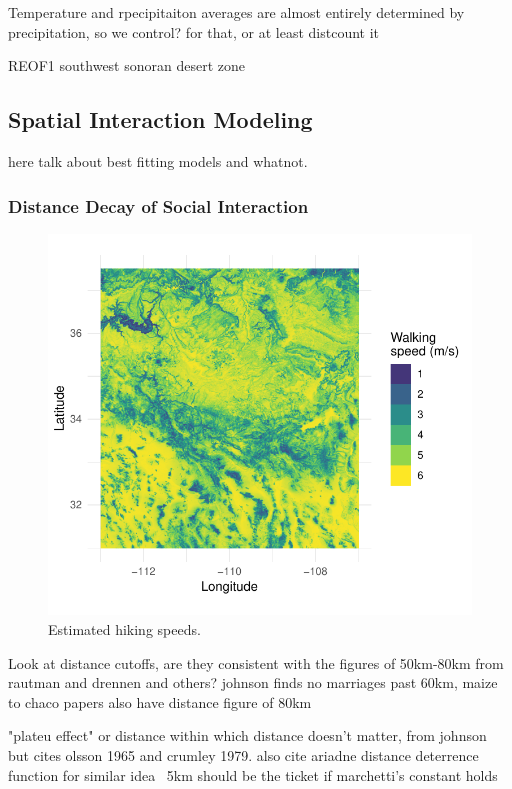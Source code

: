 \documentclass[fleqn,10pt]{wlscirep}
\begin{document}
Temperature and rpecipitaiton averages are almost entirely determined by precipitation, so we control? for that, or at least distcount it

REOF1 southwest sonoran desert zone

\subsection*{Spatial Interaction Modeling}

here talk about best fitting models and whatnot.

\subsubsection*{Distance Decay of Social Interaction}

\begin{figure}[ht]
\centering
\includegraphics[width=\linewidth]{figures/walking_speed.pdf}
\caption{Estimated hiking speeds.}
\label{fig:walking-speed}
\end{figure}

Look at distance cutoffs, are they consistent with the figures of 50km-80km from rautman and drennen and others? johnson finds no marriages past 60km, maize to chaco papers also have distance figure of 80km

"plateu effect" or distance within which distance doesn't matter, from johnson but cites olsson 1965 and crumley 1979. also cite ariadne distance deterrence function for similar idea
~5km should be the ticket if marchetti's constant holds
\end{document}
